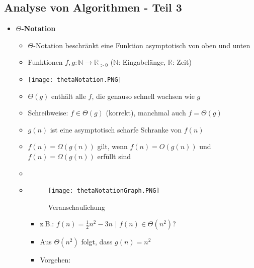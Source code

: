 \subsection{Analyse von Algorithmen - Teil 3}
    \begin{itemize}
        \item \textbf{$\Theta$-Notation}
            \begin{itemize}
                \item $\Theta$-Notation beschränkt eine Funktion asymptotisch von oben und unten
                \item Funktionen $f,g: \mathbb{N} \rightarrow \mathbb{R}_{>0}$ ($\mathbb{N}$: Eingabelänge, $\mathbb{R}$: Zeit)
                \item[] \texttt{[image: thetaNotation.PNG]}
                \item $\Theta(g)$ enthält alle $f$, die genauso schnell wachsen wie $g$
                \item Schreibweise: $f \in \Theta(g)$ (korrekt), manchmal auch $f = \Theta(g)$
                \item $g(n)$ ist eine asymptotisch scharfe Schranke von $f(n)$
                \item $f(n)= \Omega(g(n))$ gilt, wenn $f(n) = O(g(n))$ und $f(n)=\Omega(g(n))$ erfüllt sind
                \item[]
                \item[] 
                    \begin{minipage}{0.3\textwidth}
                    \begin{figure}[H]
                        \centering
                        \texttt{[image: thetaNotationGraph.PNG]}
                        \caption{Veranschaulichung}
                        \label{}
                    \end{figure}
                    \end{minipage}
                    \begin{minipage}[t]{0.6\textwidth}
                    \vspace{-3cm}
                        \begin{itemize}
                            \item z.B.: $f(n)= \frac{1}{2} n^2 - 3n$ | $f(n) \in \Theta(n^2)$?
                            \item Aus $\Theta(n^2)$ folgt, dass $g(n)=n^2$
                            \item Vorgehen:
                                \begin{itemize}

\end{itemize}
\end{itemize}
\end{minipage}
\end{itemize}
\end{itemize}
